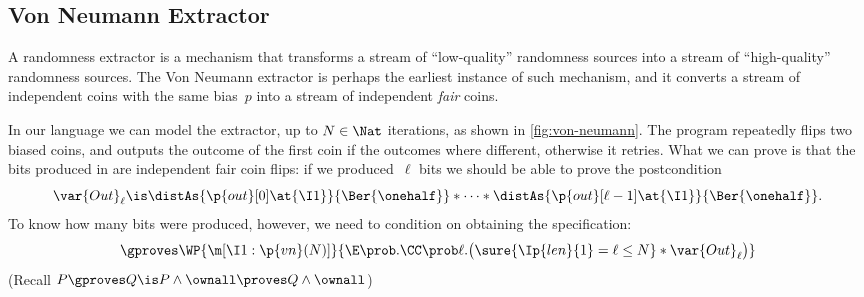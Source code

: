 \subsection{Von Neumann Extractor}
\label{sec:appendix:ex:von-neumann}

  A randomness extractor is a mechanism that transforms a stream of
``low-quality'' randomness sources into a stream of ``high-quality''
randomness sources.
The Von Neumann extractor is perhaps the earliest instance of such mechanism,
and it converts a stream of independent coins with the same bias~$p$
into a stream of independent \emph{fair} coins.

In our language we can model the extractor, up to $N \in \Nat$ iterations,
as shown in \cref{fig:von-neumann}.
The program repeatedly flips two biased coins, and outputs the outcome of the first coin if the outcomes where different, otherwise it retries.
What we can prove is that the bits produced in  are independent fair coin flips: if we produced~$\ell$ bits we should be able to prove the postcondition
\[
  \var{Out}_\ell \is
  \distAs{\p{out}[0]\at{\I1}}{\Ber{\onehalf}} *
  \dots *
  \distAs{\p{out}[\ell-1]\at{\I1}}{\Ber{\onehalf}}.
\]
To know how many bits were produced, however,
we need to condition on 
obtaining the specification:
\[
  \gproves \WP {\m[\I1: \p{vn}(N)]} {
    \E \prob. \CC \prob \ell. \bigl(
      \sure{\Ip{len}{1} = \ell \leq N} *
      \var{Out}_\ell
    \bigr)
  }
\]
(Recall $ P \gproves Q \is P \land \ownall \proves Q \land \ownall $)



